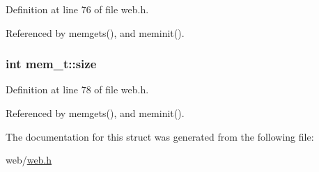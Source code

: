 Definition at line 76 of file web.\+h.



Referenced by memgets(), and meminit().

\subsubsection[{\texorpdfstring{size}{size}}]{\setlength{\rightskip}{0pt plus 5cm}int mem\+\_\+t\+::size}\hypertarget{structmem__t_ab04d46fb2982c9a26a26244286c1b33b}{}\label{structmem__t_ab04d46fb2982c9a26a26244286c1b33b}


Definition at line 78 of file web.\+h.



Referenced by memgets(), and meminit().



The documentation for this struct was generated from the following file\+:\begin{DoxyCompactItemize}
\item 
web/\hyperlink{web_8h}{web.\+h}\end{DoxyCompactItemize}

